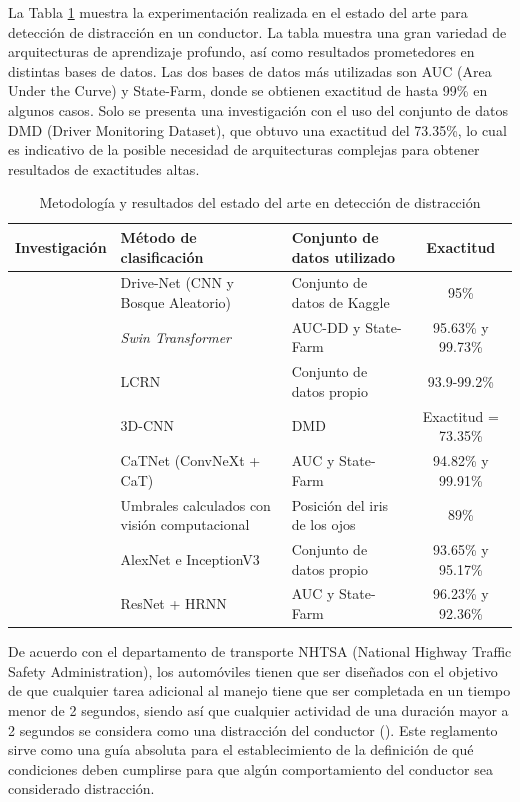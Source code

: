 La Tabla \ref{tab:distracción} muestra la experimentación realizada en el estado del arte para detección de distracción en un conductor. La tabla muestra una gran variedad de arquitecturas de aprendizaje profundo, así como resultados prometedores en distintas bases de datos. Las dos bases de datos más utilizadas son AUC (Area Under the Curve) y State-Farm, donde se obtienen exactitud de hasta 99\% en algunos casos. Solo se presenta una investigación con el uso del conjunto de datos DMD (Driver Monitoring Dataset), que obtuvo una exactitud del 73.35\%, lo cual es indicativo de la posible necesidad de arquitecturas complejas para obtener resultados de exactitudes altas. 
\begin{table}[h!]
    \centering
    \footnotesize
    \renewcommand{\arraystretch}{1.8} 
    \begin{tabularx}{\textwidth}{c X X c}
        Investigación & Método de clasificación & Conjunto de datos utilizado & Exactitud \\
        \hline
        \cite{DCNN} & Drive-Net (CNN y Bosque Aleatorio) & Conjunto de datos de Kaggle & 95\% \\
        \cite{Swin} & \textit{Swin Transformer} & AUC-DD y State-Farm & 95.63\% y 99.73\% \\
        \cite{LRCN} &  LCRN & Conjunto de datos propio & 93.9-99.2\% \\
        \cite{D3D} & 3D-CNN & DMD & Exactitud = 73.35\% \\ 
        \cite{CNN-Trans} & CaTNet (ConvNeXt + CaT) & AUC y State-Farm & 94.82\% y 99.91\% \\
        \cite{DyS-VC} & Umbrales calculados con visión computacional & Posición del iris de los ojos & 89\% \\ 
        \cite{DTF} & AlexNet e InceptionV3 & Conjunto de datos propio & 93.65\% y 95.17\% \\
        \cite{DHM-RNN} & ResNet + HRNN & AUC y State-Farm & 96.23\% y 92.36\% \\
        \hline
    \end{tabularx}
    \caption{Metodología y resultados del estado del arte en detección de distracción}
    \label{tab:distracción}
\end{table}

De acuerdo con el departamento de transporte NHTSA (National Highway Traffic Safety Administration), los automóviles tienen que ser diseñados con el objetivo de que cualquier tarea adicional al manejo tiene que ser completada en un tiempo menor de 2 segundos, siendo así que cualquier actividad de una duración mayor a 2 segundos se considera como una distracción del conductor (\cite{NHTSA}). Este reglamento sirve como una guía absoluta para el establecimiento de la definición de qué condiciones deben cumplirse para que algún comportamiento del conductor sea considerado distracción. 

